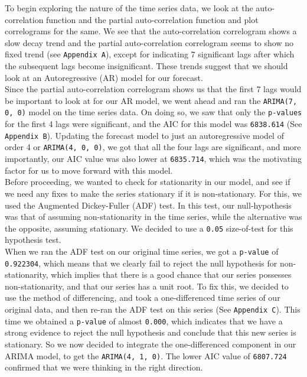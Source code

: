 \documentclass[12pt]{article}
\begin{document}
To begin exploring the nature of the time series data, we look at the auto-correlation function and the partial auto-correlation function and plot correlograms for the same. We see that the auto-correlation correlogram shows a slow decay trend and the partial auto-correlation correlogram seems to show no fixed trend (see \texttt{Appendix A}), except for indicating 7 significant lags after which the subsequent lags become insignificant. These trends suggest that we should look at an Autoregressive (AR) model for our forecast\cite{ar}.\\

Since the partial auto-correlation correlogram shows us that the first 7 lags would be important to look at for our AR model, we went ahead and ran the \texttt{ARIMA(7, 0, 0)} model on the time series data. On doing so, we saw that only the \texttt{p-values} for the first 4 lags were significant, and the AIC for this model was \texttt{6838.614} (See \texttt{Appendix B}). Updating the forecast model to just an autoregressive model of order 4 or \texttt{ARIMA(4, 0, 0)}, we got that all the four lags are significant, and more importantly, our AIC value was also lower at \texttt{6835.714}, which was the motivating factor for us to move forward with this model.\\

Before proceeding, we wanted to check for stationarity in our model, and see if we need any fixes to make the series stationary if it is non-stationary. For this, we used the Augmented Dickey-Fuller (ADF) test\cite{stationarity}. In this test, our null-hypothesis was that of assuming non-stationarity in the time series, while the alternative was the opposite, assuming stationary. We decided to use a \texttt{0.05} size-of-test for this hypothesis test.\\

When we ran the ADF test on our original time series, we got a \texttt{p-value} of \texttt{0.922304}, which means that we clearly fail to reject the null hypothesis for non-stationarity, which implies that there is a good chance that our series possesses non-stationarity, and that our series has a unit root. To fix this, we decided to use the method of differencing, and took a one-differenced time series of our original data, and then re-ran the ADF test on this series (See \texttt{Appendix C}). This time we obtained a \texttt{p-value} of almost \texttt{0.000}, which indicates that we have a strong evidence to reject the null hypothesis and conclude that this new series is stationary. So we now decided to integrate the one-differenced component in our ARIMA model, to get the \texttt{ARIMA(4, 1, 0)}. The lower AIC value of \texttt{6807.724} confirmed that we were thinking in the right direction.
\end{document}

